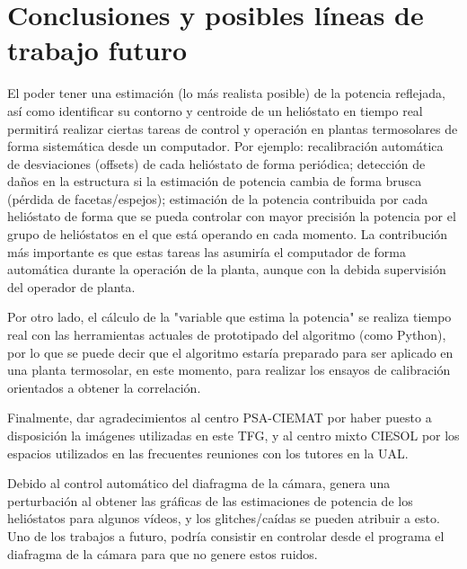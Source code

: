 \chapter{Conclusiones y posibles líneas de trabajo futuro}
 
El poder tener una estimación (lo más realista posible) de la potencia reflejada, así como identificar su contorno y centroide de un helióstato en tiempo real permitirá realizar ciertas tareas de control y operación en plantas termosolares de forma sistemática desde un computador. Por ejemplo: recalibración automática de desviaciones (offsets) de cada helióstato de forma periódica; detección de daños en la estructura si la estimación de potencia cambia de forma brusca (pérdida de facetas/espejos); estimación de la potencia contribuida por cada helióstato de forma que se pueda controlar con mayor precisión la potencia por el grupo de helióstatos en el que está operando en cada momento. La contribución más importante es que estas tareas las asumiría el computador de forma automática durante la operación de la planta, aunque con la debida supervisión del operador de planta.

Por otro lado, el cálculo de la "variable que estima la potencia" se realiza tiempo real con las herramientas actuales de prototipado del algoritmo (como Python), por lo que se puede decir que el algoritmo estaría preparado para ser aplicado en una planta termosolar, en este momento, para realizar los ensayos de calibración orientados a obtener la correlación.

Finalmente, dar agradecimientos al centro PSA-CIEMAT por haber puesto a disposición la imágenes utilizadas en este TFG, y al centro mixto CIESOL por los espacios utilizados en las frecuentes reuniones con los tutores en la UAL.

Debido al control automático del diafragma de la cámara, genera una perturbación al obtener las gráficas de las estimaciones de potencia de los helióstatos para algunos vídeos, y los glitches/caídas se pueden atribuir a esto. Uno de los trabajos a futuro, podría consistir en controlar desde el programa el diafragma de la cámara para que no genere estos ruidos.